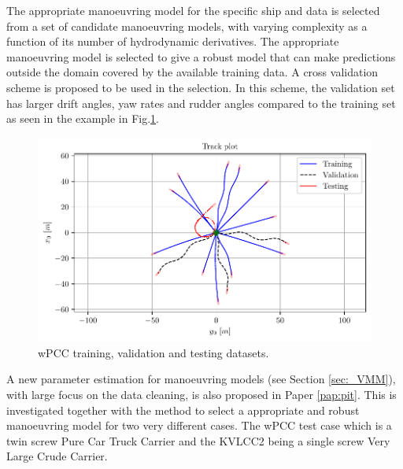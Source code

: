 The appropriate manoeuvring model for the specific ship and data is selected from a set of candidate manoeuvring models, with varying complexity as a function of its number of hydrodynamic derivatives. The appropriate manoeuvring model is selected to give a robust model that can make predictions outside the domain covered by the available training data. A cross validation scheme is proposed to be used in the selection. In this scheme, the validation set has larger drift angles, yaw rates and rudder angles compared to the training set as seen in the example in Fig.\ref{fig:cross_validation}.
\begin{figure}[!htb]
    \centering
    \includegraphics[width=\linewidth]{kappa/images/3.pdf}
    \caption{wPCC training, validation and testing datasets.}
    \label{fig:cross_validation}
\end{figure}
\noindent A new parameter estimation for manoeuvring models (see Section \ref{sec:_VMM}), with large focus on the data cleaning, is also proposed in Paper \ref{pap:pit}. This  is investigated together with the method to select a appropriate and robust manoeuvring model for two very different cases. The wPCC test case which is a twin screw Pure Car Truck Carrier and the KVLCC2 being a single screw Very Large Crude Carrier.    
